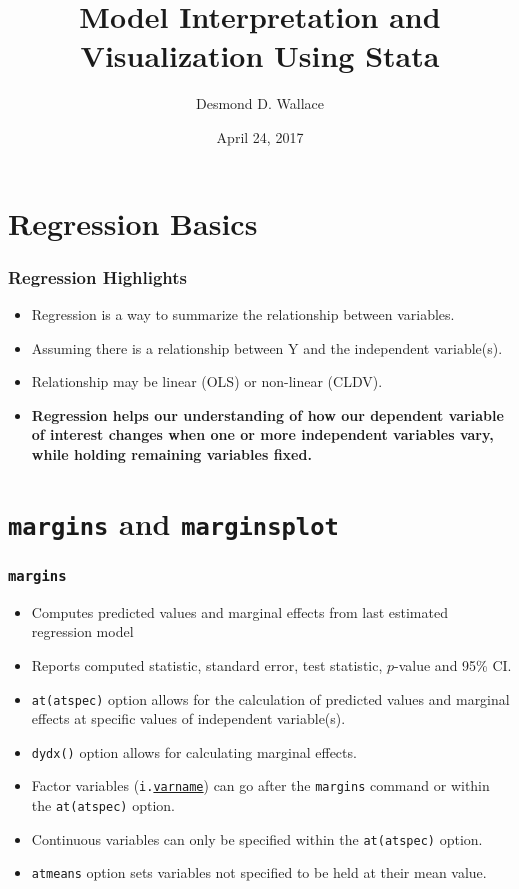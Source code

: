 \documentclass{beamer}
\title{Model Interpretation and Visualization Using Stata}
\author{Desmond D. Wallace}
\institute{Department of Political Science\\The University of Iowa\\Iowa City, IA}
\date{April 24, 2017}
\begin{document}
\begin{frame}
 \titlepage
\end{frame}


\section{Regression Basics}

\begin{frame}
	\frametitle{Regression Highlights}
	\begin{itemize}
		\item Regression is a way to summarize the relationship between variables.
		\item Assuming there is a relationship between Y and the independent variable(s).
		\item Relationship may be linear (OLS) or non-linear (CLDV).
		\item \textbf{Regression helps our understanding of how our dependent variable of interest changes when one or more independent variables vary, while holding remaining variables fixed.}
	\end{itemize}
\end{frame}

\section{\texttt{margins} and \texttt{marginsplot}}

\begin{frame}
	\frametitle{\texttt{margins}}
	\begin{itemize}
		\item Computes predicted values and marginal effects from last estimated regression model
		\item Reports computed statistic, standard error, test statistic, $p$-value and 95\% CI.
		\item \texttt{at(atspec)} option allows for the calculation of predicted values and marginal effects at specific values of independent variable(s).
		\item \texttt{dydx()} option allows for calculating marginal effects.
		\item Factor variables (\texttt{i.\underline{varname}}) can go after the \texttt{margins} command or within the \texttt{at(atspec)} option.
		\item Continuous variables can only be specified within the \texttt{at(atspec)} option.
		\item \texttt{atmeans} option sets variables not specified to be held at their mean value.
	\end{itemize}
\end{frame}
\end{document}
